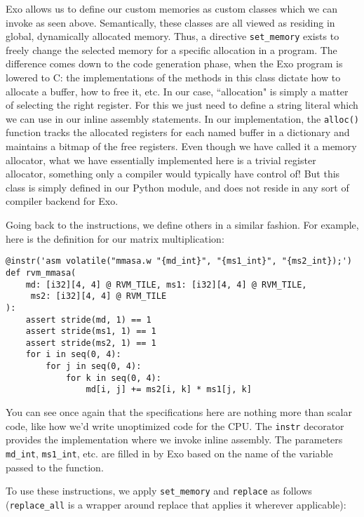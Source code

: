 \documentclass[acmsmall, nonacm=true]{acmart}
\begin{document}
Exo allows us to define our custom memories as custom classes which we can invoke as seen above. Semantically, these classes are all viewed as residing in global, dynamically allocated memory. Thus, a directive \verb|set_memory| exists to freely change the selected memory for a specific allocation in a program. The difference comes down to the code generation phase, when the Exo program is lowered to C: the implementations of the methods in this class dictate how to allocate a buffer, how to free it, etc. In our case, ``allocation" is simply a matter of selecting the right register. For this we just need to define a string literal which we can use in our inline assembly statements. In our implementation, the \verb|alloc()| function tracks the allocated registers for each named buffer in a dictionary and maintains a bitmap of the free registers. Even though we have called it a memory allocator, what we have essentially implemented here is a trivial register allocator, something only a compiler would typically have control of! But this class is simply defined in our Python module, and does not reside in any sort of compiler backend for Exo. %

Going back to the instructions, we define others in a similar fashion. For example, here is the definition for our matrix multiplication:

\begin{verbatim}
@instr('asm volatile("mmasa.w "{md_int}", "{ms1_int}", "{ms2_int});')
def rvm_mmasa(
    md: [i32][4, 4] @ RVM_TILE, ms1: [i32][4, 4] @ RVM_TILE,
     ms2: [i32][4, 4] @ RVM_TILE
):
    assert stride(md, 1) == 1
    assert stride(ms1, 1) == 1
    assert stride(ms2, 1) == 1
    for i in seq(0, 4):
        for j in seq(0, 4):
            for k in seq(0, 4):
                md[i, j] += ms2[i, k] * ms1[j, k]
\end{verbatim}

You can see once again that the specifications here are nothing more than scalar code, like how we'd write unoptimized code for the CPU. The \verb|instr| decorator provides the implementation where we invoke inline assembly. The parameters \verb|md_int|, \verb|ms1_int|, etc. are filled in by Exo based on the name of the variable passed to the function.

To use these instructions, we apply \verb|set_memory| and \verb|replace| as follows (\verb|replace_all| is a wrapper around replace that applies it wherever applicable):
\end{document}
